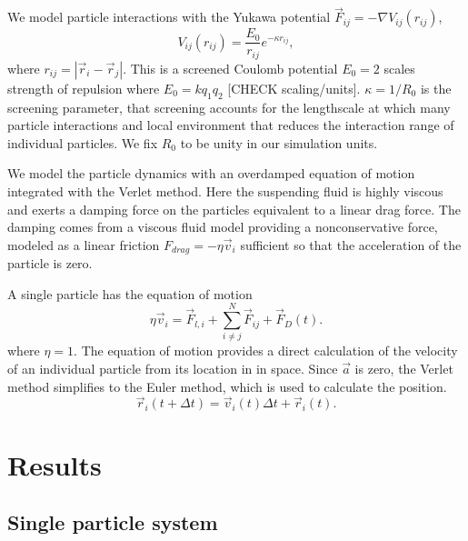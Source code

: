\documentclass[prb,preprint]{revtex4}
\begin{document}
 We model particle interactions with
 the Yukawa potential $\vec{F}_{ij} = -\nabla V_{ij}(r_{ij})$,
 \begin{equation}
   V_{ij}(r_{ij}) = \frac{E_0}{r_{ij}} e^{-\kappa r_{ij}},
 \end{equation}
 where $r_{ij} = |\vec{r}_i - \vec{r}_j|$.
 This is a
 screened Coulomb potential
 $E_0=2$ scales strength of repulsion
 where $E_0 = k q_1 q_2$  [CHECK scaling/units].
 $\kappa = 1/R_0$ is the screening parameter,
that screening accounts for the lengthscale at
which many particle
interactions and local environment
that reduces the interaction range of individual particles.
We fix $R_0$ to be unity in our simulation units.

We model the 
particle dynamics 
with an overdamped
equation of motion
integrated with the Verlet method.
Here 
the suspending fluid is highly viscous
and exerts a damping force on the particles equivalent
to a linear drag force.
The damping comes from a viscous fluid model
providing a nonconservative force,
modeled as a linear friction $F_{drag} = -\eta \vec{v}_i$
sufficient so that
the acceleration of the particle is zero. 

A single particle has the equation of motion 
\begin{equation}
\eta \vec{v}_i = \vec{F}_{l,i} + \sum_{i \neq j}^{N} \vec{F}_{ij} + \vec{F}_{D}(t).
\end{equation}
where $\eta = 1$.
The equation of motion provides a direct calculation of the velocity
of an individual particle from its location in in space.
Since $\vec{a}$ is zero,
the Verlet method simplifies to 
the Euler method,
which is used to calculate the position. %
\begin{equation}
\vec{r}_i(t+\Delta t) = \vec{v}_i(t) \Delta t + \vec{r}_i(t).
\end{equation} 




\section{Results}
\label{sec:results}

\subsection{Single particle system}
\label{sec:one}
\end{document}
